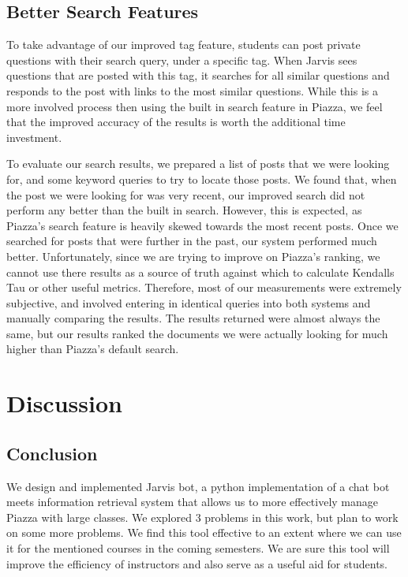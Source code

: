 \documentclass[sigconf]{acmart}
\begin{document}
\subsection{Better Search Features}
To take advantage of our improved tag feature, students can post private questions with their search query, under a specific tag. When Jarvis sees questions that are posted with this tag, it searches for all similar questions and responds to the post with links to the most similar questions. While this is a more involved process then using the built in search feature in Piazza, we feel that the improved accuracy of the results is worth the additional time investment.

To evaluate our search results, we prepared a list of posts that we were looking for, and some keyword queries to try to locate those posts. We found that, when the post we were looking for was very recent, our improved search did not perform any better than the built in search. However, this is expected, as Piazza's search feature is heavily skewed towards the most recent posts. Once we searched for posts that were further in the past, our system performed much better. Unfortunately, since we are trying to improve on Piazza's ranking, we cannot use there results as a source of truth against which to calculate Kendalls Tau or other useful metrics. Therefore, most of our measurements were extremely subjective, and involved entering in identical queries into both systems and manually comparing the results. The results returned were almost always the same, but our results ranked the documents we were actually looking for much higher than Piazza's default search.

\section{Discussion}

\subsection{Conclusion}
We design and implemented Jarvis bot, a python implementation of a chat bot meets information retrieval system that allows us to more effectively manage Piazza with large classes. We explored 3 problems in this work, but plan to work on some more problems. We find this tool effective to an extent where we can use it for the mentioned courses in the coming semesters. We are sure this tool will improve the efficiency of instructors and also serve as a useful aid for students.
\end{document}
